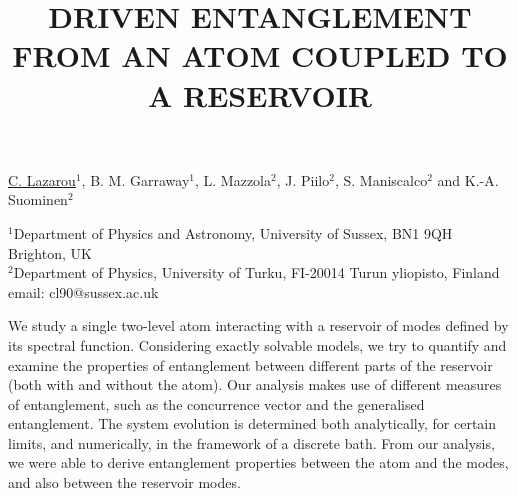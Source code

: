 \title{DRIVEN ENTANGLEMENT FROM AN ATOM COUPLED TO A RESERVOIR}

\underline{C. Lazarou}$^1$, B. M. Garraway$^1$, L. Mazzola$^2$, J. Piilo$^2$,
S. Maniscalco$^2$ and K.-A. Suominen$^2$ 


$^1$Department of Physics and Astronomy, University of Sussex, BN1 9QH Brighton, UK\\
$^2$Department of Physics, University of Turku, FI-20014 Turun yliopisto, Finland\\
email: cl90@sussex.ac.uk

We study a single two-level atom interacting with a reservoir of modes
defined by its spectral function.  Considering exactly solvable
models, we try to quantify and examine the properties of entanglement
between different parts of the reservoir (both with and without the
atom). Our analysis makes use of different measures of entanglement,
such as the concurrence vector and the generalised entanglement. The
system evolution is determined both analytically, for certain limits,
and numerically, in the framework of a discrete bath. From our
analysis, we were able to derive entanglement properties between the
atom and the modes, and also between the reservoir modes.

\vspace{\baselineskip}
